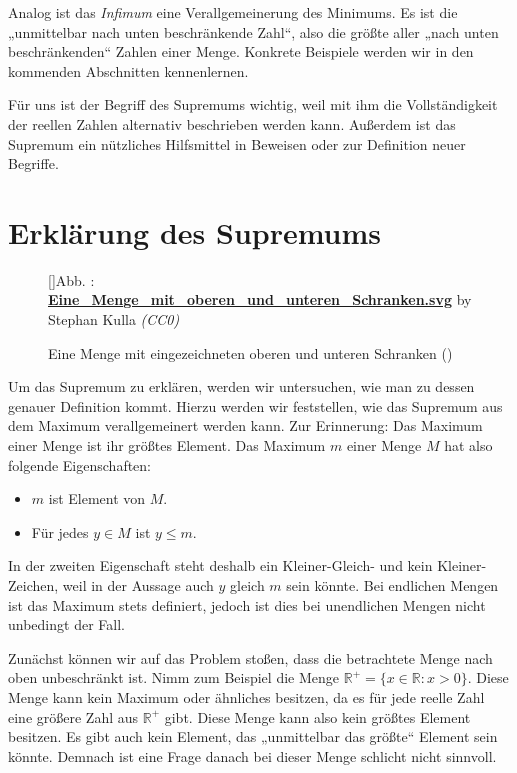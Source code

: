 \documentclass[fontsize=9pt,
               parskip=half-,
               DIV=14,
               listof=chapterentry,
               tocflat]{scrbook}
\newcounter{imagelabel}
\begin{document}
Analog ist das \emph{Infimum} eine Verallgemeinerung des Minimums. Es ist die „unmittelbar nach unten beschränkende Zahl“, also die größte aller „nach unten beschränkenden“ Zahlen einer Menge. Konkrete Beispiele werden wir in den kommenden Abschnitten kennenlernen.

Für uns ist der Begriff des Supremums wichtig, weil mit ihm die Vollständigkeit der reellen Zahlen alternativ beschrieben werden kann. Außerdem ist das Supremum ein nützliches Hilfsmittel in Beweisen oder zur Definition neuer Begriffe.

\section{Erklärung des Supremums}

\begin{figure}[h]
\vspace{\baselineskip}
[]{Abb. : \protect\href{https://commons.wikimedia.org/wiki/File:Eine_Menge_mit_oberen_und_unteren_Schranken.svg}{\textbf{Eine\allowbreak\_Menge\allowbreak\_mit\allowbreak\_oberen\allowbreak\_und\allowbreak\_unteren\allowbreak\_Schranken.svg}} by Stephan Kulla \textit{(CC0)}}\centering
{}
\caption*{Eine Menge mit eingezeichneten oberen und unteren Schranken ()}
\end{figure}
Um das Supremum zu erklären, werden wir untersuchen, wie man zu dessen genauer Definition kommt. Hierzu werden wir feststellen, wie das Supremum aus dem Maximum verallgemeinert werden kann. Zur Erinnerung: Das Maximum einer Menge ist ihr größtes Element. Das Maximum $m$ einer Menge $M$ hat also folgende Eigenschaften:

\begin{itemize}
\item $m$ ist Element von $M$.
\item Für jedes $y\in M$ ist $y\leq m$.
\end{itemize}

In der zweiten Eigenschaft steht deshalb ein Kleiner-Gleich- und kein Kleiner-Zeichen, weil in der Aussage auch $y$ gleich $m$ sein könnte. Bei endlichen Mengen ist das Maximum stets definiert, jedoch ist dies bei unendlichen Mengen nicht unbedingt der Fall.

Zunächst können wir auf das Problem stoßen, dass die betrachtete Menge nach oben unbeschränkt ist. Nimm zum Beispiel die Menge $\mathbb {R} ^{+}=\{x\in \mathbb {R} :x>0\}$. Diese Menge kann kein Maximum oder ähnliches besitzen, da es für jede reelle Zahl eine größere Zahl aus $\mathbb {R} ^{+}$ gibt. Diese Menge kann also kein größtes Element besitzen. Es gibt auch kein Element, das „unmittelbar das größte“ Element sein könnte. Demnach ist eine Frage danach bei dieser Menge schlicht nicht sinnvoll.
\end{document}
